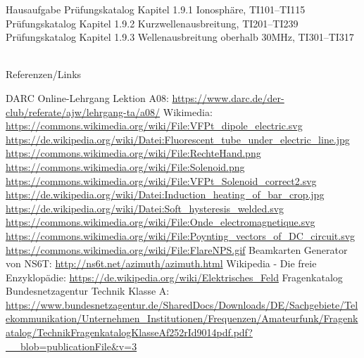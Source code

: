 \begin{frame}
  \begin{exampleblock}{Hausaufgabe}
    Prüfungskatalog Kapitel 1.9.1 Ionosphäre, TI101--TI115\\
    Prüfungskatalog Kapitel 1.9.2 Kurzwellenausbreitung, TI201--TI239\\
    Prüfungskatalog Kapitel 1.9.3 Wellenausbreitung oberhalb 30MHz, TI301--TI317
  \end{exampleblock}
\end{frame}

\renewcommand{\refname}{Referenzen}

\hypertarget{refs}{}
\textcolor{white}{} \\ %
\Large Referenzen/Links
\footnotesize

\begin{thebibliography}{}
      DARC Online-Lehrgang Lektion A08:
                    \url{https://www.darc.de/der-club/referate/ajw/lehrgang-ta/a08/}
     	Wikimedia:
                    \url{https://commons.wikimedia.org/wiki/File:VFPt_dipole_electric.svg}
                    \url{https://de.wikipedia.org/wiki/Datei:Fluorescent_tube_under_electric_line.jpg}
                    \url{https://commons.wikimedia.org/wiki/File:RechteHand.png}
                    \url{https://commons.wikimedia.org/wiki/File:Solenoid.png}
                    \url{https://commons.wikimedia.org/wiki/File:VFPt_Solenoid_correct2.svg}
                    \url{https://de.wikipedia.org/wiki/Datei:Induction_heating_of_bar_crop.jpg}
                    \url{https://de.wikipedia.org/wiki/Datei:Soft_hysteresis_welded.svg}
                    \url{https://commons.wikimedia.org/wiki/File:Onde_electromagnetique.svg}
                    \url{https://commons.wikimedia.org/wiki/File:Poynting_vectors_of_DC_circuit.svg}
                    \url{https://commons.wikimedia.org/wiki/File:FlareNPS.gif}
                    \url{}
                    \url{}
                    \url{}
                    \url{}
      Beamkarten Generator von NS6T:
                    \url{http://ns6t.net/azimuth/azimuth.html}
        Wikipedia - Die freie Enzyklopädie:
                    \url{https://de.wikipedia.org/wiki/Elektrisches_Feld}
	   Fragenkatalog Bundesnetzagentur Technik Klasse A:                   
                    \url{https://www.bundesnetzagentur.de/SharedDocs/Downloads/DE/Sachgebiete/Telekommunikation/Unternehmen_Institutionen/Frequenzen/Amateurfunk/Fragenkatalog/TechnikFragenkatalogKlasseAf252rId9014pdf.pdf?__blob=publicationFile&v=3}
\end{thebibliography} 


